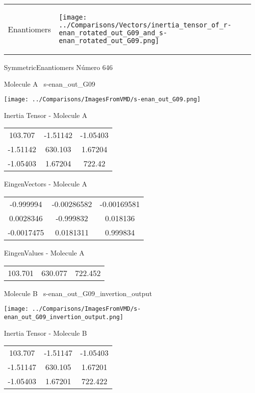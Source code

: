 \vtab[-5mm]
\begin{tabular}{*{2}{m{}}}
\begin{center}
\textcolor{NavyBlue}{\Large Enantiomers}
\end{center}
&
\begin{center}
\texttt{[image: ../Comparisons/Vectors/inertia\_tensor\_of\_r-enan\_rotated\_out\_G09\_and\_s-enan\_rotated\_out\_G09.png]}
\end{center}
\end{tabular}

 \newpage

\vtab[-3cm]
\begin{center}
{\large SymmetricEnantiomers \tab Número 646}
\end{center}
\begin{multicols}{2}
\begin{center}

Molecule A \
s-enan\_out\_G09

\texttt{[image: ../Comparisons/ImagesFromVMD/s-enan\_out\_G09.png]}

Inertia Tensor - Molecule A \\
\begin{tabular}{|c c c|}
103.707	 & 	-1.51142	 & 	-1.05403	 \\
-1.51142	 & 	630.103	 & 	1.67204	 \\
-1.05403	 & 	1.67204	 & 	722.42
\end{tabular}

\vtab
 EingenVectors - Molecule A     \\
\begin{tabular}{|c c c|}
-0.999994	 & 	-0.00286582	 & 	-0.00169581	 \\
0.0028346	 & 	-0.999832	 & 	0.018136	 \\
-0.0017475	 & 	0.0181311	 & 	0.999834
\end{tabular}

\vtab
 EingenValues - Molecule A     \\
\begin{tabular}{|c c c|}
103.701	 & 	630.077	 & 	722.452	 \\
\end{tabular}
\columnbreak

Molecule B \
s-enan\_out\_G09\_invertion\_output

\texttt{[image: ../Comparisons/ImagesFromVMD/s-enan\_out\_G09\_invertion\_output.png]}

Inertia Tensor - Molecule B \\
\begin{tabular}{|c c c|}
103.707	 & 	-1.51147	 & 	-1.05403	 \\
-1.51147	 & 	630.105	 & 	1.67201	 \\
-1.05403	 & 	1.67201	 & 	722.422
\end{tabular}


\end{center}
\end{multicols}
